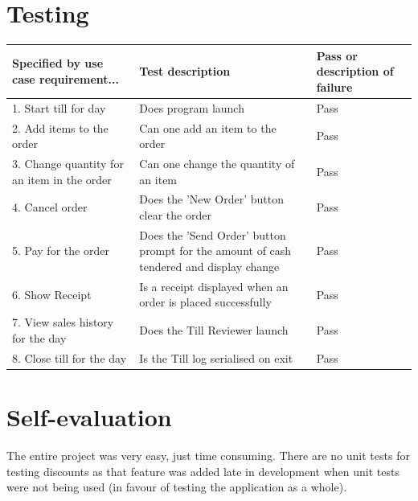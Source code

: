 \documentclass[11pt]{article} %
\begin{document}
\section{Testing}
\begin{tabular}{p{3cm}|p{6cm}|p{3cm}}
Specified by use case requirement... & Test description & Pass or description of failure \\
\hline
1. Start till for day & Does program launch & Pass \\
2. Add items to the order & Can one add an item to the order & Pass \\
3. Change quantity for an item in the order & Can one change the quantity of an item & Pass \\
4. Cancel order & Does the 'New Order' button clear the order & Pass \\
5. Pay for the order & Does the 'Send Order' button prompt for the amount of cash tendered and display change &  Pass \\
6. Show Receipt & Is a receipt displayed when an order is placed successfully & Pass \\
7. View sales history for the day & Does the Till Reviewer launch & Pass \\
8. Close till for the day & Is the Till log serialised on exit & Pass \\
\end{tabular}

\section{Self-evaluation}
The entire project was very easy, just time consuming. There are no unit tests for testing discounts as that feature was added late in development when unit tests were not being used (in favour of testing the application as a whole).
\end{document}
